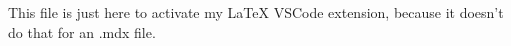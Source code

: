This file is just here to activate my LaTeX VSCode extension, because it doesn't do that for an .mdx file.